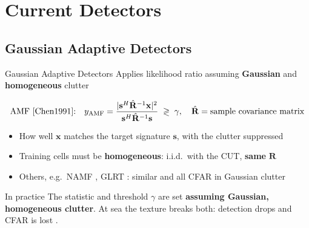 \documentclass{beamer}
\renewcommand{\footnotesize}{\scriptsize}
\begin{document}
\section{Current Detectors}

\subsection{Gaussian Adaptive Detectors}
\begin{frame}{Gaussian Adaptive Detectors}
    \small
    Applies likelihood ratio assuming \textbf{Gaussian} and \textbf{homogeneous} clutter
    \begin{center}
    \end{center}
    \vspace{-2mm}
    \[ \text{AMF \cite{Chen1991}:}\quad y_\text{AMF} = \frac{|\mathbf{s}^H\hat{\mathbf{R}}^{-1}\mathbf{x}|^2}{\mathbf{s}^H\hat{\mathbf{R}}^{-1}\mathbf{s}} \;\gtrless\; \gamma,
       \quad \hat{\mathbf{R}} = \text{sample covariance matrix} \]
    \vspace{-2mm}
    \begin{itemize}
        \item How well $\mathbf{x}$ matches the target signature $\mathbf{s}$, with the clutter suppressed
        \item Training cells must be \textbf{homogeneous}: i.i.d.\ with the CUT, \textbf{same} $\mathbf{R}$
        \item Others, e.g.\ NAMF \cite{Kraut1999}, GLRT \cite{Kelly1986}: similar and all CFAR in Gaussian clutter
    \end{itemize}
    \begin{alertblock}{In practice}
        The statistic and threshold $\gamma$ are set \textbf{assuming Gaussian, homogeneous clutter}. At sea the texture breaks both: detection drops and CFAR is lost \cite{Gini1998, Rosenberg2017}.
    \end{alertblock}
\end{frame}
\end{document}
